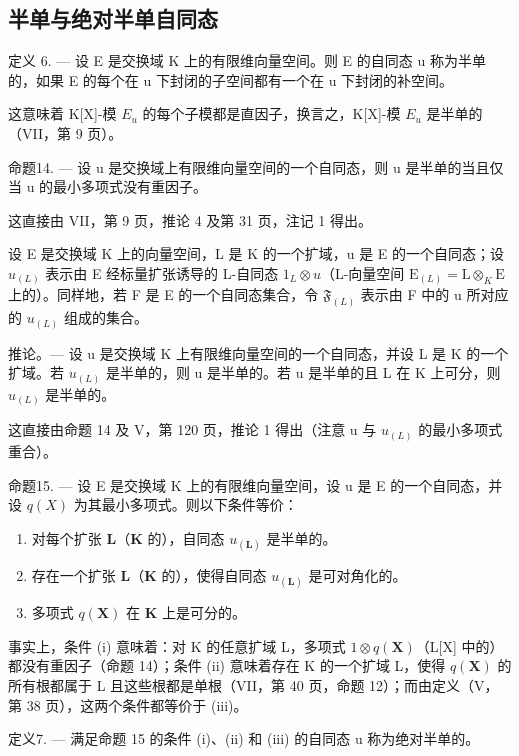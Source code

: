 \subsection{半单与绝对半单自同态}

定义 6. --- 设 E 是交换域 K 上的有限维向量空间。则 E 的自同态 u 称为半单的，如果 E 的每个在 u 下封闭的子空间都有一个在 u 下封闭的补空间。

这意味着 K{[}X{]}-模 \(E_{u}\) 的每个子模都是直因子，换言之，K{[}X{]}-模 \(E_{u}\) 是半单的（VII，第 9 页）。

命题14. --- 设 u 是交换域上有限维向量空间的一个自同态，则 u 是半单的当且仅当 u 的最小多项式没有重因子。

这直接由 VII，第 9 页，推论 4 及第 31 页，注记 1 得出。

设 E 是交换域 K 上的向量空间，L 是 K 的一个扩域，u 是 E 的一个自同态；设 \(u_{(L)}\) 表示由 E 经标量扩张诱导的 L-自同态 \(1_{L} \otimes u\)（L-向量空间 \(\mathrm{E}_{(L)} = \mathrm{L} \otimes_{K} \mathrm{E}\) 上的）。同样地，若 F 是 E 的一个自同态集合，令 \(\mathfrak{F}_{(L)}\) 表示由 F 中的 u 所对应的 \(u_{(L)}\) 组成的集合。

推论。--- 设 u 是交换域 K 上有限维向量空间的一个自同态，并设 L 是 K 的一个扩域。若 \(u_{(L)}\) 是半单的，则 u 是半单的。若 u 是半单的且 L 在 K 上可分，则 \(u_{(L)}\) 是半单的。

这直接由命题 14 及 V，第 120 页，推论 1 得出（注意 u 与 \(u_{(L)}\) 的最小多项式重合）。

命题15. --- 设 E 是交换域 K 上的有限维向量空间，设 u 是 E 的一个自同态，并设 \(q(X)\) 为其最小多项式。则以下条件等价：

\begin{enumerate}
\def\labelenumi{(\roman{enumi})}
\item
  对每个扩张 \(\mathbf{L}\)（\(\mathbf{K}\) 的），自同态 \(u_{(\mathbf{L})}\) 是半单的。
\item
  存在一个扩张 \(\mathbf{L}\)（\(\mathbf{K}\) 的），使得自同态 \(u_{(\mathbf{L})}\) 是可对角化的。
\item
  多项式 \(q(\mathbf{X})\) 在 \(\mathbf{K}\) 上是可分的。
\end{enumerate}

事实上，条件 (i) 意味着：对 K 的任意扩域 L，多项式 \(1 \otimes q(\mathbf{X})\)（L{[}X{]} 中的）都没有重因子（命题 14）；条件 (ii) 意味着存在 K 的一个扩域 L，使得 \(q(\mathbf{X})\) 的所有根都属于 L 且这些根都是单根（VII，第 40 页，命题 12）；而由定义（V，第 38 页），这两个条件都等价于 (iii)。

定义7. --- 满足命题 15 的条件 (i)、(ii) 和 (iii) 的自同态 u 称为绝对半单的。

